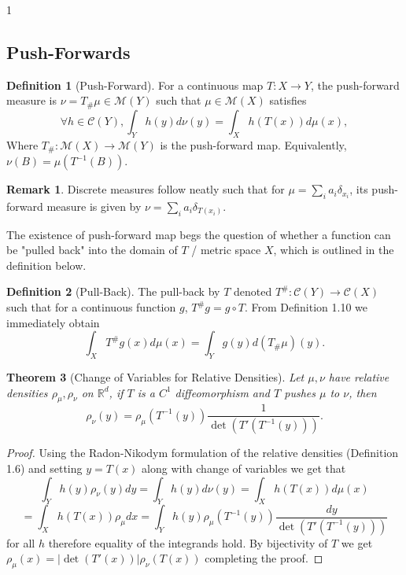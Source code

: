 \documentclass[12pt]{article}
\newtheorem{theorem}{Theorem}[section]
\theoremstyle{definition}
\newtheorem{definition}[theorem]{Definition}
\newtheorem*{remark}{Remark}
\theoremstyle{plain}
\begin{document}
\begin{spacing}{1}
\subsection{Push-Forwards}
\begin{definition}[Push-Forward]
    For a continuous map $T: X \rightarrow Y$, the push-forward measure is $\nu = T_\# \mu \in \mathcal{M}(Y)$ such that $\mu \in \mathcal{M}(X)$ satisfies
    \[
    \forall h \in \mathcal{C}(Y), \displaystyle \int_Y h(y)d\nu(y) = \displaystyle \int_X h(T(x))d\mu(x),
    \]
    Where $T_\#: \mathcal{M}(X) \rightarrow \mathcal{M}(Y)$ is the push-forward map.
    Equivalently, $\nu(B) = \mu(T^{-1}(B))$.
\end{definition}

\begin{remark}
    Discrete measures follow neatly such that for $\mu = \sum_i a_i \delta_{x_i}$, its push-forward measure is given by $\nu = \sum_i a_i \delta_{T(x_i)}$.
\end{remark}

The existence of push-forward map begs the question of whether a function can be "pulled back" into the domain of $T$ / metric space $X$, which is outlined in the definition below. 

\begin{definition}[Pull-Back]
    The pull-back by $T$ denoted $T^\#: \mathcal{C}(Y) \rightarrow \mathcal{C}(X)$ such that for a continuous function $g$, $T^\#g = g \circ T$. From Definition 1.10 we immediately obtain
    \[
    \displaystyle \int_X T^\#g(x)d\mu(x) = \displaystyle \int_Y g(y)d(T_\#\mu)(y).
    \]
\end{definition}

\begin{theorem}[Change of Variables for Relative Densities]
    Let $\mu, \nu$ have relative densities $\rho_\mu, \rho_\nu$ on $\mathbb{R}^d$, if $T$ is a $C^1$ diffeomorphism and $T$ pushes $\mu$ to $\nu$, then
    \[
    \rho_\nu(y) = \rho_\mu(T^{-1}(y))\frac{1}{\det(T'(T^{-1}(y)))}.
    \]
\end{theorem}

\begin{proof}
    Using the Radon-Nikodym formulation of the relative densities (Definition 1.6) and setting $y = T(x)$ along with change of variables we get that
    \[
    \displaystyle \int_Y h(y)\rho_\nu(y)dy = \displaystyle \int_Y h(y) d\nu(y) = \displaystyle \int_X h(T(x))d\mu(x) \]
    \[ = \displaystyle \int_X h(T(x)) \rho_\mu dx = \displaystyle \int_Y h(y) \rho_\mu(T^{-1}(y))\frac{dy}{\det(T'(T^{-1}(y)))}
    \]
    for all $h$ therefore equality of the integrands hold. By bijectivity of $T$ we get $\rho_\mu(x) = \lvert \det(T'(x))\rvert \rho_\nu(T(x))$ completing the proof.
\end{proof}


\end{spacing}
\end{document}
